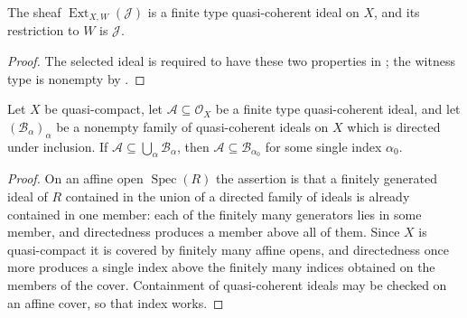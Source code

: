 \begin{lemma}
  \label{lemma:nagata-extend-finite-type-ideal}
  \leanok

  The sheaf $\operatorname{Ext}_{X,W}(\mathcal J)$ is a finite type
  quasi-coherent ideal on $X$, and its restriction to $W$ is
  $\mathcal J$.
\end{lemma}

\begin{proof}
  \leanok
  The selected ideal is required to have these two properties in
  ; the witness type is nonempty
  by .
\end{proof}

\begin{lemma}
  \label{lemma:nagata-finite-type-ideal-compact}
  \leanok

  Let $X$ be quasi-compact, let $\mathcal A\subseteq\mathcal O_X$ be a finite
  type quasi-coherent ideal, and let $(\mathcal B_\alpha)_\alpha$ be a nonempty
  family of quasi-coherent ideals on $X$ which is directed under inclusion.  If
  $\mathcal A\subseteq\bigcup_\alpha\mathcal B_\alpha$, then
  $\mathcal A\subseteq\mathcal B_{\alpha_0}$ for some single index $\alpha_0$.
\end{lemma}

\begin{proof}
  \leanok
  On an affine open $\operatorname{Spec}(R)$ the assertion is that a finitely
  generated ideal of $R$ contained in the union of a directed family of ideals
  is already contained in one member: each of the finitely many generators lies
  in some member, and directedness produces a member above all of them.  Since
  $X$ is quasi-compact it is covered by finitely many affine opens, and
  directedness once more produces a single index above the finitely many
  indices obtained on the members of the cover.  Containment of quasi-coherent
  ideals may be checked on an affine cover, so that index works.
\end{proof}

